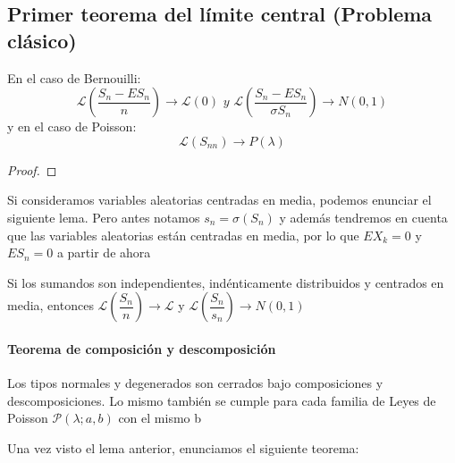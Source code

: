 \subsection{Primer teorema del límite central (Problema clásico)}
En el caso de Bernouilli:
$$\mathcal{L}\left( \frac{S_n-ES_n}{n}  \right)\rightarrow \mathcal{L}(0) \,\, y \,\, \mathcal{L}\left( \frac{S_n-ES_n}{\sigma S_n}  \right)\rightarrow N(0,1)$$
y en el caso de Poisson:
$$\mathcal{L}(S_{nn})\rightarrow P(\lambda)$$
\begin{proof}

\end{proof}
Si consideramos variables aleatorias centradas en media, podemos enunciar el siguiente lema. Pero antes notamos $s_n=\sigma(S_n)$ y además tendremos en cuenta que las variables aleatorias están centradas en media, por lo que $EX_k=0$ y $ES_n=0$ a partir de ahora
\begin{lemma}
Si los sumandos son independientes, indénticamente distribuidos y centrados en media, entonces $\mathcal{L} \left( \dfrac{S_n}{n} \right)\rightarrow \mathcal{L}$ y $\mathcal{L} \left( \dfrac{S_n}{s_n} \right)\rightarrow N(0,1)$
\end{lemma}
\paragraph{Teorema de composición y descomposición}
\begin{theorem}
Los tipos normales y degenerados son cerrados bajo composiciones y descomposiciones. Lo mismo también se cumple para cada familia de Leyes de Poisson $\mathcal{P}(\lambda ; a,b)$ con el mismo b
\end{theorem}
Una vez visto el lema anterior, enunciamos el siguiente teorema:



